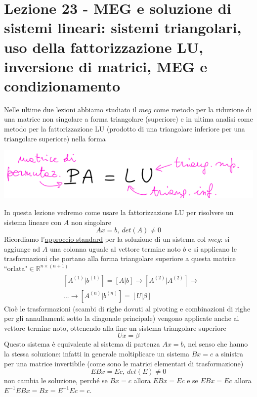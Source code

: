 \documentclass[12pt,a4paper]{article}
\begin{document}
\section[Lezione 23 - MEG e soluzioni di sistemi lineari]{Lezione 23 - MEG e soluzione di sistemi lineari: sistemi triangolari, uso della fattorizzazione LU, inversione di matrici, MEG e condizionamento}
Nelle ultime due lezioni abbiamo studiato il $meg$ come metodo per la riduzione di una matrice non singolare a forma triangolare (superiore) e in ultima analisi come metodo per la fattorizzazione LU (prodotto di una triangolare inferiore per una triangolare superiore) nella forma
\begin{center}
    \includegraphics[scale=0.7]{lez23_pag1.png}
\end{center}
In questa lezione vedremo come usare la fattorizzazione LU per risolvere un sistema lineare con $A$ non singolare
\begin{equation*}
    Ax=b, \ det(A)\neq 0
\end{equation*}
Ricordiamo l'\uline{approccio standard} per la soluzione di un sistema col $meg$: si aggiunge ad $A$ una colonna uguale al vettore termine noto $b$ e si applicano le trasformazioni che portano alla forma triangolare superiore a questa matrice ``orlata"$\in \mathbb{R}^{n \times (n+1)}$
\begin{equation*}
    \begin{split}
        & [A^{(1)}|b^{(1)}] = [A|b]\rightarrow [A^{(2)}|A^{(2)}] \rightarrow \\
        & ... \rightarrow [A^{(n)}|b^{(n)}] = [U|\beta]
    \end{split}
\end{equation*}
Cioè le trasformazioni (scambi di righe dovuti al pivoting e combinazioni di righe per gli annullamenti sotto la diagonale principale) vengono applicate anche al vettore termine noto, ottenendo alla fine un sistema triangolare superiore
\begin{equation*}
    Ux=\beta
\end{equation*}
Questo sistema è equivalente al sistema di partenza $Ax=b$, nel senso che hanno la stessa soluzione: infatti in generale moltiplicare un sistema $Bx=c$ a sinistra per una matrice invertibile (come sono le matrici elementari di trasformazione)
\begin{equation*}
    EBx = Ec, \ det(E) \neq 0
\end{equation*}
non cambia le soluzione, perché se $Bx=c$ allora $EBx=Ec$ e se $EBx=Ec$ allora $E^{-1}EBx = Bx = E^{-1}Ec = c$.
\end{document}
